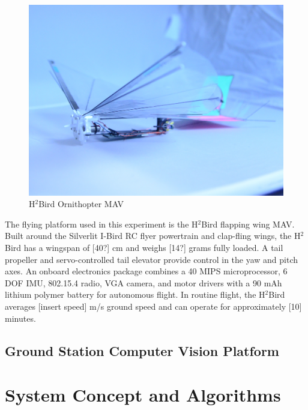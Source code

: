 \documentclass[letterpaper, 10 pt, conference]{ieeeconf}
\begin{document}
\begin{figure}[tb]
\centering
\includegraphics[width=\linewidth]{figures/h2bird.jpg}
\caption{H$^2$Bird Ornithopter MAV}
\label{fig:h2bird}
\end{figure}

The flying platform used in this experiment is the H$^2$Bird flapping wing MAV. Built around the Silverlit I-Bird RC flyer powertrain and clap-fling wings, the H$^2$Bird has a wingspan of [40?] cm and weighs [14?] grams fully loaded. A tail propeller and servo-controlled tail elevator provide control in the yaw and pitch axes. An onboard electronics package combines a 40 MIPS microprocessor, 6 DOF IMU, 802.15.4 radio, VGA camera, and motor drivers with a 90 mAh lithium polymer battery for autonomous flight. In routine flight, the H$^2$Bird averages [insert speed] m/s ground speed and can operate for approximately [10] minutes.

\subsection{Ground Station Computer Vision Platform}


\section{System Concept and Algorithms}
\end{document}
